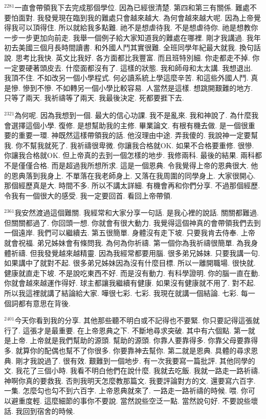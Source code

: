 \documentclass{book}
\begin{document}
$^{2281}$一直會帶領我下去完成那個學位.
因為已經很清楚.
第四和第三有關係.
難處不要怕面對.
我發覺現在臨到我的難處只會越來越大.
為何會越來越大呢.
因為上帝覺得我可以頂得住.
所以就給我多點難.
祂不是想虐待我.
不是想虐待你.
祂是想教你一步一步更加向前走.
我舉一個例子給大家知道我的難處在哪裡.
剛才我講過.
我年初去美國三個月長時間讀書.
和外國人鬥其實很難.
全班同學年紀最大就我.
換句話說.
思考比我快.
英文比我好.
各方面都比我豐富.
而且班特別細.
你走都走不掉.
你一定要硬著頭皮去.
什麼面都沒有了.
這樣的狀態.
我和師母和太太講.
我想退出.
我頂不住.
不如改另一個小學程式.
何必讀系統上學這麼辛苦.
和這些外國人鬥.
真是慘.
慘到不慘.
不如轉另一個小學比較容易.
人當然是這樣.
想跳開艱難的地方.
只等了兩天.
我祈禱等了兩天.
我最後決定.
死都要捱下去.

$^{2321}$為何呢.
因為我想到一個.
最大的信心功課.
我不是亂來.
我和神說了.
為什麼我會選擇這個小學.
復修.
是想幫助我的主修.
畢業論文.
有根有機去做.
是一個很重要的重要一環.
神既然這樣帶領我的話.
他沒理由中途.
弄我傻的.
我說神一定要幫我.
你不幫我就死了.
我祈禱很卑微.
你讓我合格就OK.
如果不合格要重修.
很慘.
你讓我合格就OK.
但上帝真的去到一個怎樣的地步.
我修兩科.
最後的結果.
兩科都不是僅僅合格.
而是超過我所想所求.
這是一個恩典.
令我覺得上帝的恩典很大.
他的恩典落到我身上.
不單落在我老師身上.
又落在我周圍的同學身上.
大家很開心.
那個經歷真是大.
時間不多.
所以不講太詳細.
有機會再和你們分享.
不過那個經歷.
令我有一個很大的感受.
我一定要回首.
看回上帝帶領.

$^{2361}$我安然渡過這個難關.
我經常和大家分享一句話.
是我心裡的說話.
關關都難過.
但關關都過了.
你回頭一想.
你就會有很大動力.
我覺得這個神真的會帶領我們去到一個遠岸.
我們可以繼續去.
第五很簡單.
身體沒有走下坡.
只要我肯去侍奉.
上帝就會祝福.
弟兄姊妹會有條問我.
為何為你祈禱.
第一個你為我祈禱很簡單.
為我身體祈禱.
但我發覺越來越精靈.
因為我經常都要用腦.
很多弟兄姊妹.
只要我講一句.
如果講中了就對不起.
很多弟兄姊妹因為沒有什麼目標.
所以一離開職場.
很快就.
健康就直走下坡.
不是說吃東西不好.
而是沒有動力.
有科學證明.
你的腦一直在動.
你就會越來越運作得好.
球主都讓我繼續有健康.
如果沒有健康就不用了.
對不起.
所以我這裡就講了結論給大家.
嘩很七彩.
七彩.
我現在就講一個結論.
七彩.
每一個詞都有意思在背後.

$^{2401}$今天你看到我的分享.
其他那些聽不明白或不記得也不要緊.
你只要記得這張就行了.
這張才是最重要.
在上帝恩典之下.
不斷地尋求突破.
其中有六個點.
第一就是上帝.
上帝就是我們幫助的源頭.
幫助的源頭.
你靠人要靠得多.
你靠父母要靠得多.
就算你的配偶也幫不了你很多.
你要靠神去幫你.
第二就是恩典.
具體的尋求恩典.
剛才我說過了.
很有效.
艱難到一個地步.
有一次我要寫一篇批評.
其他同學的文.
我花了三個小時.
我看不明白他們在說什麼.
我就去吃飯.
我就一路走一路祈禱.
神啊你真的要救我.
否則我明天怎麼教那篇文.
我要評論對方的文.
還要寫六百字.
一集.
怎麼勾也勾不到六百字.
上帝恩典就來了.
一路走一路祈禱的時候.
喂.
你可以避重度輕.
這麼細節的事你不要說.
當然說些空泛一點.
當然說句好.
不要說些壞話.
我回到宿舍的時候.
\end{document}
